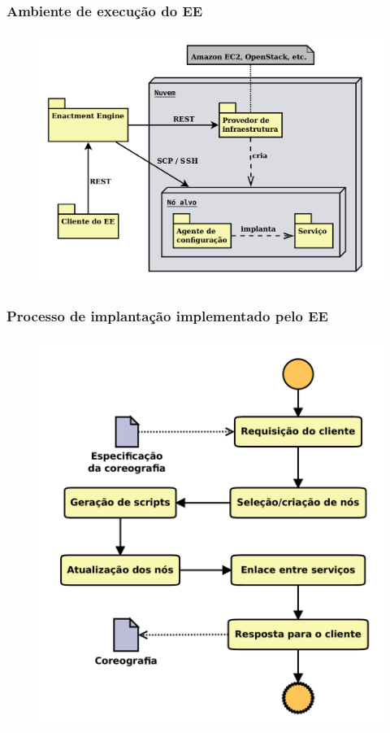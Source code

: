 \documentclass{beamer}
\begin{document}

\begin{frame}
\frametitle{Ambiente de execução do EE}

\begin{figure}
\includegraphics[width=0.8\linewidth]{img/arquitetura}
\end{figure}

\end{frame}


\begin{frame}
\frametitle{Processo de implantação implementado pelo EE}

\begin{figure}
\includegraphics[width=0.55\linewidth]{img/processo}
\end{figure}

\end{frame}

\end{document}
